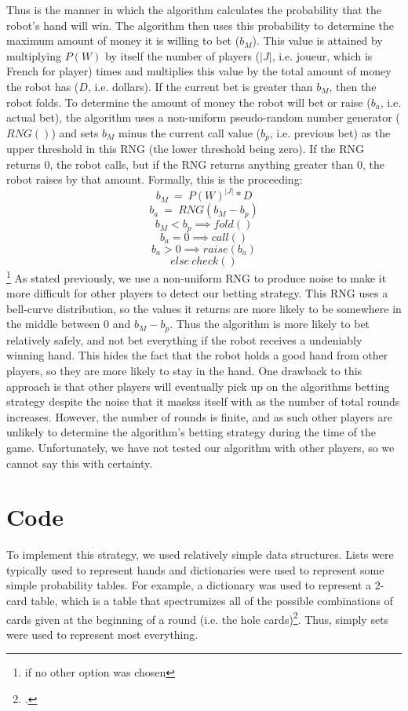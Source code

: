 \documentclass[10pt, a4paper, twocolumn]{article} %
\begin{document}
Thus is the manner in which the algorithm calculates the probability that the robot's hand will win. The algorithm then uses this probability to determine the maximum amount of money it is willing to bet ($b_M$). This value is attained by multiplying $P(W)$ by itself the number of players ($|J|$, i.e. joueur, which is French for player) times and multiplies this value by the total amount of money the robot has ($D$, i.e. dollars). If the current bet is greater than $b_M$, then the robot folds. To determine the amount of money the robot will bet or raise ($b_a$, i.e. actual bet), the algorithm uses a non-uniform pseudo-random number generator ($RNG()$) and sets $b_M$ minus the current call value ($b_p$, i.e. previous bet) as the upper threshold in this RNG (the lower threshold being zero). If the RNG returns $0$, the robot calls, but if the RNG returns anything greater than $0$, the robot raises by that amount. Formally, this is the proceeding:
$$b_M\ =\ P(W)^{|J|} * D$$
$$b_a\ =\ RNG(b_M-b_p)$$
$$b_M < b_p \implies fold()$$
$$b_a = 0 \implies call()$$
$$b_a > 0 \implies raise(b_a)$$
$$else\ check()$$\footnote{if no other option was chosen}
As stated previously, we use a non-uniform RNG to produce noise to make it more difficult for other players to detect our betting strategy. This RNG uses a bell-curve distribution, so the values it returns are more likely to be somewhere in the middle between $0$ and $b_M-b_p$. Thus the algorithm is more likely to bet relatively safely, and not bet everything if the robot receives a undeniably winning hand. This hides the fact that the robot holds a good hand from other players, so they are more likely to stay in the hand. One drawback to this approach is that other players will eventually pick up on the algorithms betting strategy despite the noise that it maskss itself with as the number of total rounds increases. However, the number of rounds is finite, and as such other players are unlikely to determine the algorithm's betting strategy during the time of the game. Unfortunately, we have not tested our algorithm with other players, so we cannot say this with certainty.


\section{Code}

To implement this strategy, we used relatively simple data structures. Lists were typically used to represent hands and dictionaries were used to represent some simple probability tables. For example, a dictionary was used to represent a 2-card table, which is a table that spectrumizes all of the possible combinations of cards given at the beginning of a round (i.e. the hole cards)\footcite{Reference5}. Thus, simply sets were used to represent most everything.
\end{document}
